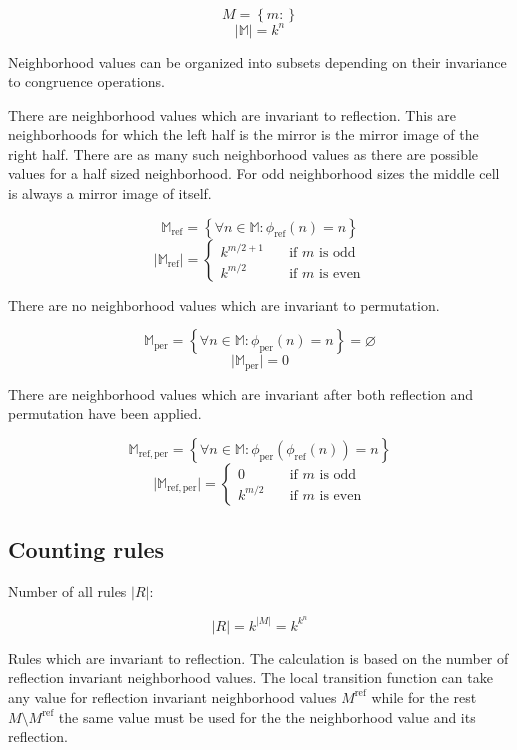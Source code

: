 \documentclass{ijuc}
\begin{document}
\[ M = \left\{ m : \right\} \]
\[ \vert \mathbb{M} \vert = k^n \]

Neighborhood values can be organized into subsets depending on their invariance to congruence operations.

There are neighborhood values which are invariant to reflection. This are neighborhoods for which the
left half is the mirror is the mirror image of the right half. There are as many such neighborhood
values as there are possible values for a half sized neighborhood. For odd neighborhood sizes the middle
cell is always a mirror image of itself.

\[ \mathbb{M}_\mathrm{ref} = \left\{ \forall n \in \mathbb{M} : \phi_\mathrm{ref}(n) = n \right\} \]
\[ \vert \mathbb{M}_\mathrm{ref} \vert = \left\{ 
  \begin{array}{ll}
    {k^{m/2+1}} & \quad \textrm{if $m$ is odd }\\
    {k^{m/2  }} & \quad \textrm{if $m$ is even}
  \end{array} \right.
\]

There are no neighborhood values which are invariant to permutation.

\[ \mathbb{M}_\mathrm{per} = \left\{ \forall n \in \mathbb{M} : \phi_\mathrm{per}(n) = n \right\} = \varnothing \]
\[ \vert \mathbb{M}_\mathrm{per} \vert = 0 \]

There are neighborhood values which are invariant after both reflection and permutation have been applied.

\[ \mathbb{M}_\mathrm{ref,per} = \left\{ \forall n \in \mathbb{M} : \phi_\mathrm{per}(\phi_\mathrm{ref}(n)) = n \right\} \]
\[ \vert \mathbb{M}_\mathrm{ref,per} \vert = \left\{ 
  \begin{array}{ll}
    {0        } & \quad \textrm{if $m$ is odd }\\
    {k^{m/2  }} & \quad \textrm{if $m$ is even}
  \end{array} \right.
\]

\subsection{Counting rules}

Number of all rules \(\vert R \vert\):

\[ \vert R \vert = k^{\vert M \vert} = k^{k^n} \]

Rules which are invariant to reflection. The calculation is based on the number of
reflection invariant neighborhood values. The local transition function can take any
value for reflection invariant neighborhood values \(M^\mathrm{ref}\) while for the
rest \(M  \setminus M^\mathrm{ref}\) the same value must be used
for the the neighborhood value and its reflection.
\end{document}
